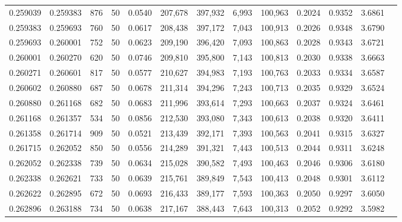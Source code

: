 \begin{tabular}{rrrrrrrrrrrrr}
0.259039 & 0.259383 &   876 &  50 &                                     0.0540 & 207,678 & 397,932 &   6,993 & 100,963 & 0.2024 & 0.9352 & 3.6861 \\
0.259383 & 0.259693 &   760 &  50 &                                     0.0617 & 208,438 & 397,172 &   7,043 & 100,913 & 0.2026 & 0.9348 & 3.6790 \\
0.259693 & 0.260001 &   752 &  50 &                                     0.0623 & 209,190 & 396,420 &   7,093 & 100,863 & 0.2028 & 0.9343 & 3.6721 \\
0.260001 & 0.260270 &   620 &  50 &                                     0.0746 & 209,810 & 395,800 &   7,143 & 100,813 & 0.2030 & 0.9338 & 3.6663 \\
0.260271 & 0.260601 &   817 &  50 &                                     0.0577 & 210,627 & 394,983 &   7,193 & 100,763 & 0.2033 & 0.9334 & 3.6587 \\
0.260602 & 0.260880 &   687 &  50 &                                     0.0678 & 211,314 & 394,296 &   7,243 & 100,713 & 0.2035 & 0.9329 & 3.6524 \\
0.260880 & 0.261168 &   682 &  50 &                                     0.0683 & 211,996 & 393,614 &   7,293 & 100,663 & 0.2037 & 0.9324 & 3.6461 \\
0.261168 & 0.261357 &   534 &  50 &                                     0.0856 & 212,530 & 393,080 &   7,343 & 100,613 & 0.2038 & 0.9320 & 3.6411 \\
0.261358 & 0.261714 &   909 &  50 &                                     0.0521 & 213,439 & 392,171 &   7,393 & 100,563 & 0.2041 & 0.9315 & 3.6327 \\
0.261715 & 0.262052 &   850 &  50 &                                     0.0556 & 214,289 & 391,321 &   7,443 & 100,513 & 0.2044 & 0.9311 & 3.6248 \\
0.262052 & 0.262338 &   739 &  50 &                                     0.0634 & 215,028 & 390,582 &   7,493 & 100,463 & 0.2046 & 0.9306 & 3.6180 \\
0.262338 & 0.262621 &   733 &  50 &                                     0.0639 & 215,761 & 389,849 &   7,543 & 100,413 & 0.2048 & 0.9301 & 3.6112 \\
0.262622 & 0.262895 &   672 &  50 &                                     0.0693 & 216,433 & 389,177 &   7,593 & 100,363 & 0.2050 & 0.9297 & 3.6050 \\
0.262896 & 0.263188 &   734 &  50 &                                     0.0638 & 217,167 & 388,443 &   7,643 & 100,313 & 0.2052 & 0.9292 & 3.5982 \\

\end{tabular}
